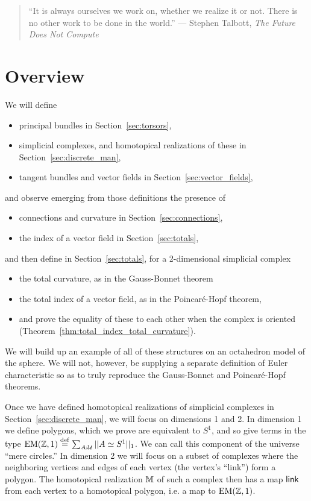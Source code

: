 
\begin{quote} 
``It is always ourselves we work on, whether we realize it or not. There is no other work to be done in the world.''
 --- Stephen Talbott, \emph{The Future Does Not Compute}\cite{talbott}
\end{quote}

\section{Overview}

We will define 
\begin{itemize}
\item principal bundles in Section~\ref{sec:torsors},
\item simplicial complexes, and homotopical realizations of these in Section~\ref{sec:discrete_man},
\item tangent bundles and vector fields in Section~\ref{sec:vector_fields},
\end{itemize}
and observe emerging from those definitions the presence of
\begin{itemize}
\item connections and curvature in Section~\ref{sec:connections},
\item the index of a vector field in Section~\ref{sec:totals},
\end{itemize}
and then define in Section~\ref{sec:totals}, for a 2-dimensional simplicial complex
\begin{itemize}
\item the total curvature, as in the Gauss-Bonnet theorem
\item the total index of a vector field, as in the Poincaré-Hopf theorem,
\item and prove the equality of these to each other when the complex is oriented (Theorem~\ref{thm:total_index_total_curvature}).
\end{itemize}

We will build up an example of all of these structures on an octahedron model of the sphere. We will not, however, be supplying a separate definition of Euler characteristic so as to truly reproduce the Gauss-Bonnet and Poincaré-Hopf theorems.

Once we have defined homotopical realizations of simplicial complexes in Section~\ref{sec:discrete_man}, we will focus on dimensions 1 and 2. In dimension 1 we define polygons, which we prove are equivalent to \( S^1 \), and so give terms in the type \( \mathrm{EM}(\mathbb{Z},1)\stackrel{\mathrm{def}}{=} \sum_{A:\mathcal{U}}||A\simeq S^1||_1 \). We can call this component of the universe ``mere circles.'' In dimension 2 we will focus on a subset of complexes where the neighboring vertices and edges of each vertex (the vertex's ``link'') form a polygon. The homotopical realization \( \mathbb{M} \) of such a complex then has a map \( \operatorname{\mathsf{link}} \) from each vertex to a homotopical polygon, i.e. a map to \( \mathrm{EM}(\mathbb{Z},1) \). 

